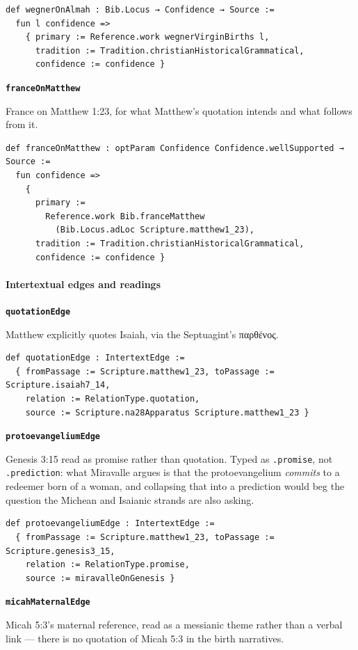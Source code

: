\documentclass[11pt]{article}
\begin{document}
{\small\begin{verbatim}
def wegnerOnAlmah : Bib.Locus → Confidence → Source :=
  fun l confidence =>
    { primary := Reference.work wegnerVirginBirths l,
      tradition := Tradition.christianHistoricalGrammatical,
      confidence := confidence }
\end{verbatim}}
\par\medskip\noindent\textbf{\texttt{france\allowbreak{}On\allowbreak{}Matthew}}\par\nobreak\noindent
France on Matthew 1:23, for what Matthew’s quotation intends and what follows from it.

{\small\begin{verbatim}
def franceOnMatthew : optParam Confidence Confidence.wellSupported → Source :=
  fun confidence =>
    {
      primary :=
        Reference.work Bib.franceMatthew
          (Bib.Locus.adLoc Scripture.matthew1_23),
      tradition := Tradition.christianHistoricalGrammatical,
      confidence := confidence }
\end{verbatim}}
\paragraph*{Intertextual edges and readings}
\leavevmode\par\nobreak
\par\medskip\noindent\textbf{\texttt{quotation\allowbreak{}Edge}}\par\nobreak\noindent
Matthew explicitly quotes Isaiah, via the Septuagint’s παρθένος.

{\small\begin{verbatim}
def quotationEdge : IntertextEdge :=
  { fromPassage := Scripture.matthew1_23, toPassage := Scripture.isaiah7_14,
    relation := RelationType.quotation,
    source := Scripture.na28Apparatus Scripture.matthew1_23 }
\end{verbatim}}
\par\medskip\noindent\textbf{\texttt{protoevangelium\allowbreak{}Edge}}\par\nobreak\noindent
Genesis 3:15 read as promise rather than quotation. Typed as \texttt{.promise}, not \texttt{.prediction}: what Miravalle argues is that the protoevangelium \emph{commits} to a redeemer born of a woman, and collapsing that into a prediction would beg the question the Michean and Isaianic strands are also asking.

{\small\begin{verbatim}
def protoevangeliumEdge : IntertextEdge :=
  { fromPassage := Scripture.matthew1_23, toPassage := Scripture.genesis3_15,
    relation := RelationType.promise,
    source := miravalleOnGenesis }
\end{verbatim}}
\par\medskip\noindent\textbf{\texttt{micah\allowbreak{}Maternal\allowbreak{}Edge}}\par\nobreak\noindent
Micah 5:3’s maternal reference, read as a messianic theme rather than a verbal link — there is no quotation of Micah 5:3 in the birth narratives.
\end{document}
